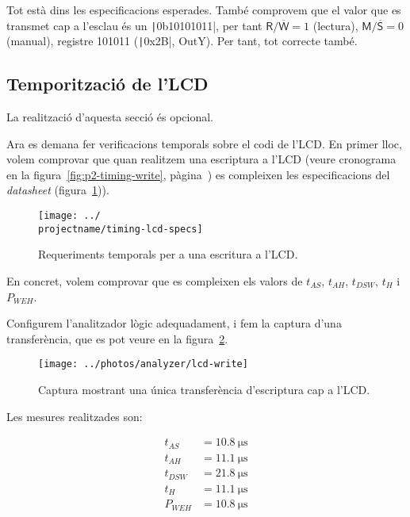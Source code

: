 Tot està dins les especificacions esperades. També comprovem que el valor que es transmet cap a l'esclau
és un \texttt|0b10101011|, per tant $\mathsf{R}/\overline{\mathsf{W}} = 1$ (lectura), $\mathsf{M}/\overline{\mathsf{S}} = 0$ (manual), registre 101011 (\texttt|0x2B|, OutY). Per tant, tot correcte també.


\clearpage
\subsection{Temporització de l'LCD} \label{sub:p4-lcd}

\opcional
La realització d'aquesta secció és opcional.

Ara es demana fer verificacions temporals sobre el codi de l'LCD. En primer lloc, volem
comprovar que quan realitzem una escriptura a l'LCD (veure cronograma en la 
figura~\ref{fig:p2-timing-write}, pàgina~\pageref{fig:p2-timing-write}) es compleixen les
especificacions del \emph{datasheet} (figura~\ref{fig:p4-timing-lcd-specs})).

\begin{figure}
  \texttt{[image: ../\\projectname/timing-lcd-specs]}
  \caption{ \label{fig:p4-timing-lcd-specs} Requeriments temporals per a una escritura a l'LCD. }
\end{figure}

En concret, volem comprovar que es compleixen els valors de $t_{AS}$, $t_{AH}$, $t_{DSW}$, $t_H$ i $P_{WEH}$.

Configurem l'analitzador lògic adequadament, i fem la captura d'una transferència, que es pot
veure en la figura~\ref{fig:p4-analyzer-lcd-write}.

\begin{figure}
  \texttt{[image: ../photos/analyzer/lcd-write]}
  \caption{ \label{fig:p4-analyzer-lcd-write} Captura mostrant una única transferència d'escriptura cap a l'LCD. }
\end{figure}

Les mesures realitzades son:

\begin{align*}
  t_{AS} &= \SI{10.8}{\micro\second}
\\
  t_{AH} &= \SI{11.1}{\micro\second}
\\
  t_{DSW} &= \SI{21.8}{\micro\second}
\\
  t_{H} &= \SI{11.1}{\micro\second}
\\
  P_{WEH} &= \SI{10.8}{\micro\second}
\end{align*}

